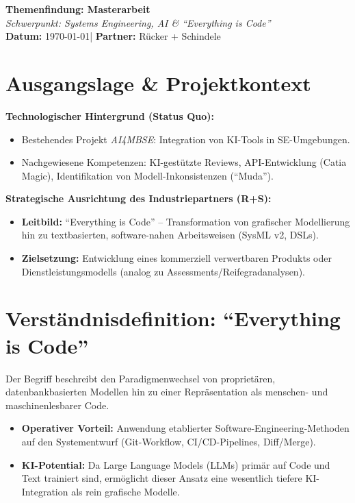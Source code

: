 \documentclass[a4paper,11pt]{article}
\begin{document}
\begin{center}
    {\Huge \textbf{Themenfindung: Masterarbeit}}\\[0.5em]
    {\Large \textit{Schwerpunkt: Systems Engineering, AI \& \enquote{Everything is Code}}}\\[1em]
    \textbf{Datum:} \today \quad | \quad \textbf{Partner:} Rücker + Schindele
\end{center}

\hrulefill

\section{Ausgangslage \& Projektkontext}

\textbf{Technologischer Hintergrund (Status Quo):}
\begin{itemize}[itemsep=0pt]
    \item Bestehendes Projekt \textit{AI4MBSE}: Integration von KI-Tools in SE-Umgebungen.
    \item Nachgewiesene Kompetenzen: KI-gestützte Reviews, API-Entwicklung (Catia Magic), Identifikation von Modell-Inkonsistenzen (\enquote{Muda}).
\end{itemize}

\textbf{Strategische Ausrichtung des Industriepartners (R+S):}
\begin{itemize}[itemsep=0pt]
    \item \textbf{Leitbild:} \enquote{Everything is Code} – Transformation von grafischer Modellierung hin zu textbasierten, software-nahen Arbeitsweisen (SysML v2, DSLs).
    \item \textbf{Zielsetzung:} Entwicklung eines kommerziell verwertbaren Produkts oder Dienstleistungsmodells (analog zu Assessments/Reifegradanalysen).
\end{itemize}

\section{Verständnisdefinition: \enquote{Everything is Code}}

Der Begriff beschreibt den Paradigmenwechsel von proprietären, datenbankbasierten Modellen hin zu einer Repräsentation als menschen- und maschinenlesbarer Code.
\begin{itemize}
    \item \textbf{Operativer Vorteil:} Anwendung etablierter Software-Engineering-Methoden auf den Systementwurf (Git-Workflow, CI/CD-Pipelines, Diff/Merge).
    \item \textbf{KI-Potential:} Da Large Language Models (LLMs) primär auf Code und Text trainiert sind, ermöglicht dieser Ansatz eine wesentlich tiefere KI-Integration als rein grafische Modelle.
\end{itemize}
\end{document}
